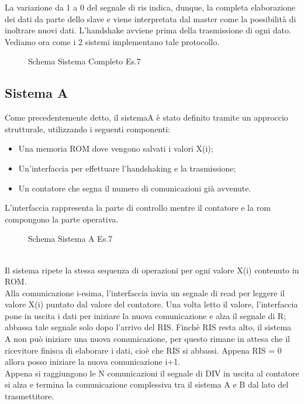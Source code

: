 \documentclass[12pt]{article}
\def \Esette {Allegati/Esercizio7/}
\begin{document}
La variazione da 1 a 0 del segnale di ris indica, dunque, la completa elaborazione dei dati da parte dello slave e viene interpretata dal master come la possibilità di inoltrare nuovi dati.
L’handshake avviene prima della trasmissione di ogni dato.
Vediamo ora come i 2 sistemi implementano tale protocollo.
\begin{figure}[ht!]
    \centering
    
    \caption{Schema Sistema Completo Es.7}
\end{figure}
\clearpage
\subsection{Sistema A}
Come precedentemente detto, il sistemaA è stato definito tramite un approccio strutturale, utilizzando i seguenti componenti:
\begin{itemize}
    \item Una memoria ROM dove vengono salvati i valori X(i);
    \item Un'interfaccia per effettuare l'handshaking e la trasmissione;
    \item Un contatore che segna il numero di comunicazioni già avvenute.
\end{itemize}
L’interfaccia rappresenta la parte di controllo mentre il contatore e la rom compongono la parte operativa.
\begin{figure}[ht!]
    \centering
    
    \caption{Schema Sistema A Es.7}
\end{figure}
\\Il sistema ripete la stessa sequenza di operazioni per ogni valore X(i) contenuto in ROM.
\\Alla comunicazione i-esima, l'interfaccia invia un segnale di read per leggere il valore X(i) puntato dal valore del contatore. Una volta letto il valore, l'interfaccia pone in uscita i dati per iniziare la nuova comunicazione e alza il segnale di R; abbassa tale segnale solo dopo l'arrivo del RIS. Finchè RIS resta alto, il sistema A non può iniziare una nuova comunicazione, per questo rimane in attesa che il ricevitore finisca di elaborare i dati, cioè che RIS si abbassi. Appena RIS = 0 allora posso iniziare la nuova comunicazione i+1.
\\Appena si raggiungono le N comunicazioni il segnale di DIV in uscita al contatore si alza e termina la comunicazione complessiva tra il sistema A e B dal lato del trasmettitore.
\clearpage
\end{document}
